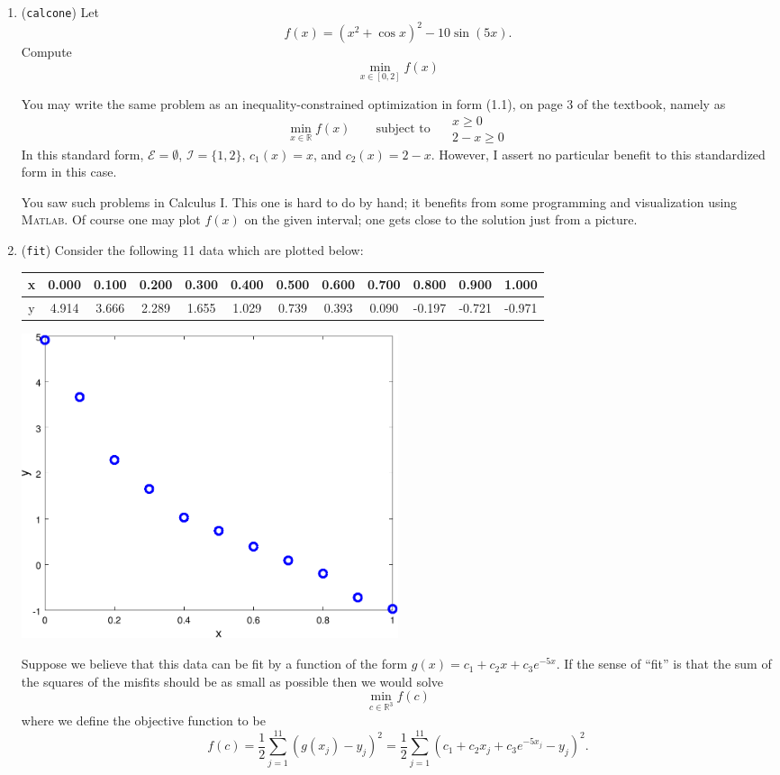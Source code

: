 \documentclass[11pt]{amsart}
\newcommand{\RR}{\mathbb{R}}
\newcommand{\Matlab}{\textsc{Matlab}\xspace}
\begin{document}
\bigskip
\renewcommand{\labelenumi}{\Roman{enumi}. \quad}
\begin{enumerate}
\item (\texttt{calcone})  \quad Let
    $$f(x) = \left(x^2 + \cos x\right)^2 - 10 \sin(5 x).$$
Compute
    $$\min_{x\in [0,2]} f(x)$$

You may write the same problem as an inequality-constrained optimization in form (1.1), on page 3 of the textbook, namely as
	$$\min_{x\in\RR} f(x) \qquad \text{subject to }\quad \begin{matrix} x \ge 0 \\ 2 - x \ge 0\end{matrix}$$
In this standard form, $\mathcal{E}=\emptyset$, $\mathcal{I}=\{1,2\}$, $c_1(x)=x$, and $c_2(x)=2-x$.  However, I assert no particular benefit to this standardized form in this case.

You saw such problems in Calculus I.  This one is hard to do by hand; it benefits from some programming and visualization using \Matlab.  Of course one may plot $f(x)$ on the given interval; one gets close to the solution just from a picture.


\medskip
\item (\texttt{fit})  \quad Consider the following 11 data which are plotted below:

\bigskip
\begin{tabular}{c|ccccccccccc}
x & 0.000 & 0.100 & 0.200 & 0.300 & 0.400 & 0.500 & 0.600 & 0.700 &  0.800 &  0.900 &  1.000 \\
\hline
y & 4.914 & 3.666 & 2.289 & 1.655 & 1.029 & 0.739 & 0.393 & 0.090 & -0.197 & -0.721 & -0.971
\end{tabular}

\bigskip
\begin{center}
\includegraphics[width=0.5\textwidth]{fitdata}
\end{center}

\medskip
Suppose we believe that this data can be fit by a function of the form $g(x) = c_1 + c_2 x + c_3 e^{-5 x}$.  If the sense of ``fit'' is that the sum of the squares of the misfits should be as small as possible then we would solve
	$$\min_{c \in \RR^3} f(c)$$
where we define the objective function to be
	$$f(c) = \frac{1}{2} \sum_{j=1}^{11} \left(g(x_j) - y_j\right)^2 = \frac{1}{2} \sum_{j=1}^{11} \left(c_1 + c_2 x_j + c_3 e^{-5 x_j} - y_j\right)^2.$$


\end{enumerate}
\end{document}
